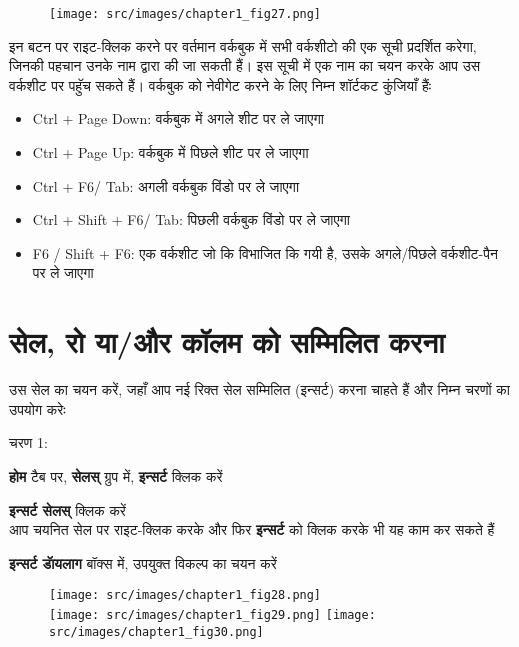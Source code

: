 \begin{figure}[H]
\centering
\texttt{[image: src/images/chapter1\_fig27.png]}
\end{figure}

इन बटन पर राइट-क्लिक करने पर वर्तमान वर्कबुक में सभी वर्कशीटो की एक सूची प्रदर्शित करेगा, जिनकी पहचान उनके नाम द्वारा की जा सकती हैं। इस सूची में एक नाम का चयन करके आप उस वर्कशीट पर पहॅुच सकते हैं। वर्कबुक को नेवीगेट करने के लिए निम्न शॉर्टकट कुंजियाँ हैंः
\begin{itemize}[topsep=-1ex,parsep=0ex,partopsep=0ex,itemsep=0.5ex]
\item  {\rm Ctrl + Page Down:}  वर्कबुक में अगले शीट पर ले जाएगा
\item  {\rm Ctrl + Page Up:}  वर्कबुक में पिछले शीट पर ले जाएगा
\item  {\rm Ctrl + F6/ Tab:}  अगली वर्कबुक विंडो पर ले जाएगा
\item  {\rm Ctrl + Shift + F6/ Tab:}  पिछली वर्कबुक विंडो पर ले जाएगा
\item  {\rm F6 / Shift + F6:}  एक वर्कशीट जो कि विभाजित कि गयी है, उसके अगले/पिछले वर्कशीट-पैन पर ले जाएगा			
\end{itemize}
				
\section{सेल, रो या/और कॉलम को सम्मिलित करना}\label{id-1.15}


उस सेल का चयन करें, जहाँ आप नई रिक्त सेल सम्मिलित (इन्सर्ट) करना चाहते हैं और निम्न चरणों का उपयोग करेः
\begin{descriptionSimple}{चरण 1:}
\item[चरण 1] \textbf{होम} टैब पर, \textbf{सेलस्} ग्रुप में, \textbf{इन्सर्ट} क्लिक करें
\item[चरण 2] \textbf{इन्सर्ट सेलस्} क्लिक करें\\  आप चयनित सेल पर राइट-क्लिक करके और फिर \textbf{इन्सर्ट} को क्लिक करके भी यह काम कर सकते हैं
\item[चरण 3] \textbf{इन्सर्ट डॅायलाग} बॉक्स में, उपयुक्त विकल्प का चयन करें
\end{descriptionSimple}
\begin{figure}[H]
\centering
\texttt{[image: src/images/chapter1\_fig28.png]}\\[4pt]
\texttt{[image: src/images/chapter1\_fig29.png]}\qquad
\texttt{[image: src/images/chapter1\_fig30.png]}
\end{figure}

